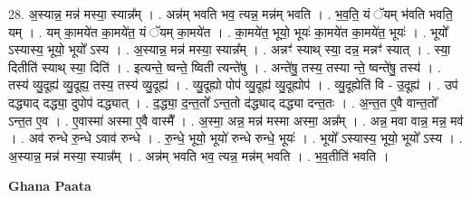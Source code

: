 \documentclass[17pt]{extarticle}
\begin{document}
28. अ॒स्यान्न॒ मन्न॑ मस्या॒ स्यान्न᳚म् । . अन्न॑म् भवति भव॒ त्यन्न॒ मन्न॑म् भवति । . भ॒व॒ति॒ यं ॅयम् भ॑वति भवति॒ यम् । . यम् का॒मये॑त का॒मये॑त॒ यं ॅयम् का॒मये॑त । . का॒मये॑त॒ भूयो॒ भूयः॑ का॒मये॑त का॒मये॑त॒ भूयः॑ । . भूयो᳚ ऽस्यास्य॒ भूयो॒ भूयो᳚ ऽस्य । . अ॒स्यान्न॒ मन्न॑ मस्या॒ स्यान्न᳚म् । . अन्नꣳ॑ स्याथ् स्या॒ दन्न॒ मन्नꣳ॑ स्यात् । . स्या॒ दितीति॑ स्याथ् स्या॒ दिति॑ । . इत्यन्ते॒ ष्वन्ते॒ ष्विती त्यन्ते॑षु । . अन्ते॑षु॒ तस्य॒ तस्या न्ते॒ ष्वन्ते॑षु॒ तस्य॑ । . तस्य॑ व्यु॒दूह्य॑ व्यु॒दूह्य॒ तस्य॒ तस्य॑ व्यु॒दूह्य॑ । . व्यु॒दूह्यो पोप॑ व्यु॒दूह्य॑ व्यु॒दूह्योप॑ । . व्यु॒दूह्येति॑ वि - उ॒दूह्य॑ । . उप॑ दद्ध्याद् दद्ध्या॒ दुपोप॑ दद्ध्यात् । . द॒द्ध्या॒ द॒न्त॒तो᳚ ऽन्त॒तो द॑द्ध्याद् दद्ध्या दन्त॒तः । . अ॒न्त॒त ए॒वै वान्त॒तो᳚ ऽन्त॒त ए॒व । . ए॒वास्मा॑ अस्मा ए॒वै वास्मै᳚ । . अ॒स्मा॒ अन्न॒ मन्न॑ मस्मा अस्मा॒ अन्न᳚म् । . अन्न॒ मवा वान्न॒ मन्न॒ मव॑ । . अव॑ रुन्धे रु॒न्धे ऽवाव॑ रुन्धे । . रु॒न्धे॒ भूयो॒ भूयो॑ रुन्धे रुन्धे॒ भूयः॑ । . भूयो᳚ ऽस्यास्य॒ भूयो॒ भूयो᳚ ऽस्य । . अ॒स्यान्न॒ मन्न॑ मस्या॒ स्यान्न᳚म् । . अन्न॑म् भवति भव॒ त्यन्न॒ मन्न॑म् भवति । . भ॒व॒तीति॑ भवति । \newline

\textbf{Ghana Paata } \newline
\end{document}
